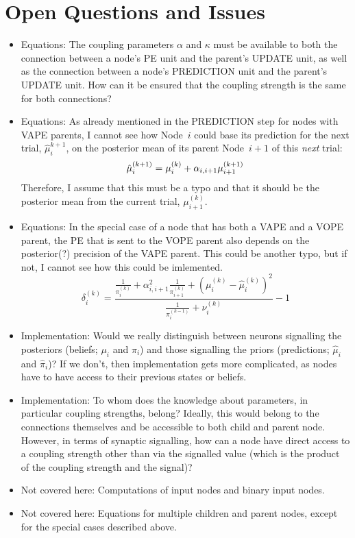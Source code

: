 \section{Open Questions and Issues}

\begin{itemize}
\item Equations: The coupling parameters $\alpha$ and $\kappa$ must be available to both the connection between a node's \textsf{PE unit} and the parent's \textsf{UPDATE unit}, as well as the connection between a node's \textsf{PREDICTION unit} and the parent's \textsf{UPDATE unit}. How can it be ensured that the coupling strength is the same for both connections?

\item Equations: As already mentioned in the \textsf{PREDICTION step} for nodes with \textsf{VAPE} parents, I cannot see how Node~$i$ could base its prediction for the next trial, $\hat{\mu}_i^{k+1}$, on the posterior mean of its parent Node~$i+1$ of this \textit{next} trial:
\begin{equation}
\hat{\mu}_i^{(k+1)} = \mu_i^{(k)} + \alpha_{i,i+1} \mu_{i+1}^{(k+1)}\\
\end{equation}
Therefore, I assume that this must be a typo and that it should be the posterior mean from the current trial, $\mu_{i+1}^{(k)}$.

\item Equations: In the special case of a node that has both a \textsf{VAPE} and a \textsf{VOPE} parent, the PE that is sent to the \textsf{VOPE} parent also depends on the posterior(?) precision of the \textsf{VAPE} parent. This could be another typo, but if not, I cannot see how this could be imlemented.
\begin{equation}
\delta_i^{(k)} 	= \frac{\frac{1}{\pi_i^{(k)}}
				+ \alpha_{i,i+1}^2 \frac{1}{\pi_{i+1}^{(k)}}
				+ (\mu_i^{(k)} - \hat{\mu}_i^{(k)})^2}
				{\frac{1}{\pi_i^{(k-1)}} + \nu_i^{(k)}} - 1
\end{equation}

\item Implementation: Would we really distinguish between neurons signalling the posteriors (beliefs; $\mu_i$ and $\pi_i$) and those signalling the priors (predictions; $\hat{\mu}_i$ and $\hat{\pi}_i$)? If we don't, then implementation gets more complicated, as nodes have to have access to their previous states or beliefs.

\item Implementation: To whom does the knowledge about parameters, in particular coupling strengths, belong? Ideally, this would belong to the connections themselves and be accessible to both child and parent node. However, in terms of synaptic signalling, how can a node have direct access to a coupling strength other than via the signalled value (which is the product of the coupling strength and the signal)?

\item Not covered here: Computations of input nodes and binary input nodes.
\item Not covered here: Equations for multiple children and parent nodes, except for the special cases described above.
\end{itemize}